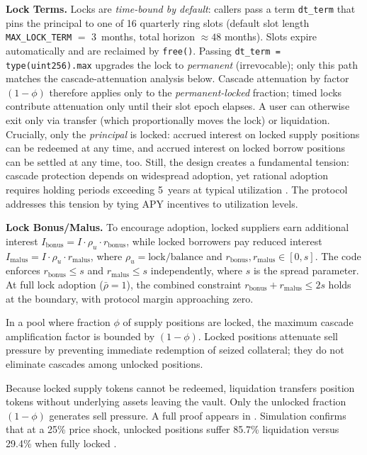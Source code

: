 \documentclass[10pt,a4paper,twocolumn]{article}
\begin{document}
\textbf{Lock Terms.} Locks are \emph{time-bound by default}: callers pass a term \texttt{dt\_term} that pins the principal to one of 16 quarterly ring slots (default slot length \texttt{MAX\_LOCK\_TERM} $=$ 3~months, total horizon $\approx 48$ months). Slots expire automatically and are reclaimed by \texttt{free()}. Passing \texttt{dt\_term = type(uint256).max} upgrades the lock to \emph{permanent} (irrevocable); only this path matches the cascade-attenuation analysis below. Cascade attenuation by factor $(1{-}\phi)$ therefore applies only to the \emph{permanent-locked} fraction; timed locks contribute attenuation only until their slot epoch elapses. A user can otherwise exit only via transfer (which proportionally moves the lock) or liquidation. Crucially, only the \emph{principal} is locked: accrued interest on locked supply positions can be redeemed at any time, and accrued interest on locked borrow positions can be settled at any time, too. Still, the design creates a fundamental tension: cascade protection depends on widespread adoption, yet rational adoption requires holding periods exceeding 5~years at typical utilization \cite{mtp}. The protocol addresses this tension by tying APY incentives to utilization levels.

\textbf{Lock Bonus/Malus.} To encourage adoption, locked suppliers earn additional interest $I_{\text{bonus}} = I \cdot \rho_u \cdot r_{\text{bonus}}$, while locked borrowers pay reduced interest $I_{\text{malus}} = I \cdot \rho_u \cdot r_{\text{malus}}$, where $\rho_u = \text{lock}/\text{balance}$ and $r_{\text{bonus}}, r_{\text{malus}} \in [0, s]$. The code enforces $r_{\text{bonus}} \leq s$ and $r_{\text{malus}} \leq s$ independently, where $s$ is the spread parameter. At full lock adoption ($\bar{\rho} = 1$), the combined constraint $r_{\text{bonus}} + r_{\text{malus}} \leq 2s$ holds at the boundary, with protocol margin approaching zero.

\begin{theorem}
\label{thm:cascade}
In a pool where fraction $\phi$ of supply positions are locked, the maximum cascade amplification factor is bounded by $(1{-}\phi)$. Locked positions attenuate sell pressure by preventing immediate redemption of seized collateral; they do not eliminate cascades among unlocked positions.
\end{theorem}

Because locked supply tokens cannot be redeemed, liquidation transfers position tokens without underlying assets leaving the vault. Only the unlocked fraction $(1{-}\phi)$ generates sell pressure. A full proof appears in \cite{mtp}. Simulation confirms that at a 25\% price shock, unlocked positions suffer 85.7\% liquidation versus 29.4\% when fully locked \cite{sim}.
\end{document}
